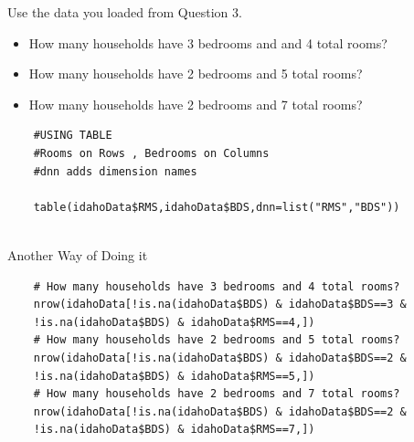 \documentclass{beamer}
\begin{document}
\begin{frame}[fragile]
Use the data you loaded from Question 3. 

\begin{itemize}
	\item How many households have 3 bedrooms and and 4 total rooms? 
	\item How many households have 2 bedrooms and 5 total rooms? 
	\item How many households have 2 bedrooms and 7 total rooms?
\end{itemize}
\begin{framed}
	\begin{verbatim}
	#USING TABLE
	#Rooms on Rows , Bedrooms on Columns
	#dnn adds dimension names
	
	table(idahoData$RMS,idahoData$BDS,dnn=list("RMS","BDS"))
	
	\end{verbatim}
\end{framed}

\end{frame}
\begin{frame}[fragile]
Another Way of Doing it
\begin{framed}
	\begin{verbatim}
	# How many households have 3 bedrooms and 4 total rooms?
	nrow(idahoData[!is.na(idahoData$BDS) & idahoData$BDS==3 &
	!is.na(idahoData$BDS) & idahoData$RMS==4,])
	# How many households have 2 bedrooms and 5 total rooms?
	nrow(idahoData[!is.na(idahoData$BDS) & idahoData$BDS==2 &
	!is.na(idahoData$BDS) & idahoData$RMS==5,])
	# How many households have 2 bedrooms and 7 total rooms?
	nrow(idahoData[!is.na(idahoData$BDS) & idahoData$BDS==2 &
	!is.na(idahoData$BDS) & idahoData$RMS==7,])
	
	\end{verbatim}
\end{framed}
\end{frame}

\end{document}
